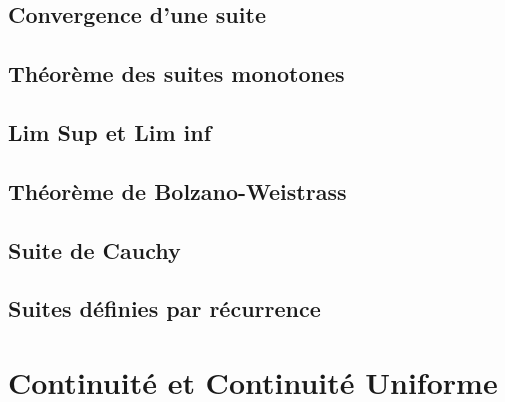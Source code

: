 \documentclass{article}
\begin{document}
\subsection{Convergence d'une suite}

\begin{definition}
\end{definition}

\begin{intuition}
\end{intuition}

\begin{remark}
\end{remark}

\begin{definition}
\end{definition}
\begin{definition}
\begin{definition}
\begin{definition}
\end{definition}
\end{definition}
\end{definition}

\subsection{Théorème des suites monotones}

\subsection{Lim Sup et Lim inf}

\subsection{Théorème de Bolzano-Weistrass}

\subsection{Suite de Cauchy}

\subsection{Suites définies par récurrence}


\pagebreak
\section{Continuité et Continuité Uniforme}
\end{document}
